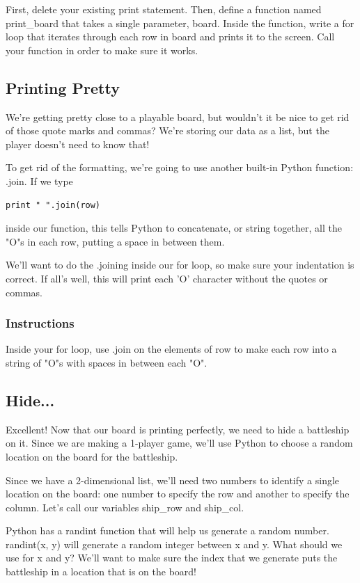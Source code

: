\documentclass[12pt,a4paper,final,twoside,onecolumn,titlepage]{book}
\begin{document}
First, delete your existing print statement. Then, define a function named print\_board that takes a single parameter, board. Inside the function, write a for loop that iterates through each row in board and prints it to the screen. Call your function in order to make sure it works.

\subsection{Printing Pretty}

We're getting pretty close to a playable board, but wouldn't it be nice to get rid of those quote marks and commas? We're storing our data as a list, but the player doesn't need to know that!

To get rid of the formatting, we're going to use another built-in Python function: .join. If we type
\begin{lstlisting}
print " ".join(row)
\end{lstlisting}
inside our function, this tells Python to concatenate, or string together, all the "O"s in each row, putting a space in between them.

We'll want to do the .joining inside our for loop, so make sure your indentation is correct. If all's well, this will print each 'O' character without the quotes or commas.
\subsubsection{Instructions}

Inside your for loop, use .join on the elements of row to make each row into a string of "O"s with spaces in between each "O".

\subsection{Hide...}

Excellent! Now that our board is printing perfectly, we need to hide a battleship on it. Since we are making a 1-player game, we'll use Python to choose a random location on the board for the battleship.

Since we have a 2-dimensional list, we'll need two numbers to identify a single location on the board: one number to specify the row and another to specify the column. Let's call our variables ship\_row and ship\_col.

Python has a randint function that will help us generate a random number. randint(x, y) will generate a random integer between x and y. What should we use for x and y? We'll want to make sure the index that we generate puts the battleship in a location that is on the board!
\end{document}

